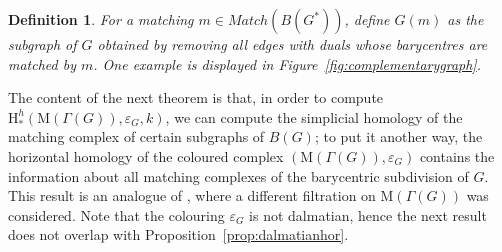 \documentclass[11pt, a4paper, reqno, twoside, makeidx]{amsart}
\theoremstyle{remark}
\theoremstyle{plain}
\newtheorem{defi}[thm]{Definition}
\theoremstyle{definition}
\newcommand{\HH}{\mathrm{H}}
\newcommand{\Mat}{\mathrm{M}}
\begin{document}
\begin{defi}
For a matching $m \in Match(B(G^*))$, define $G(m)$ as the subgraph of $G$ obtained by removing all edges with duals whose barycentres are matched by $m$. One example is displayed in Figure~\ref{fig:complementarygraph}.
\end{defi}
The content of the next theorem is that, in order to compute $\HH^h_*(\Mat (\Gamma(G)), \varepsilon_G, k)$, we can compute the simplicial homology of the matching complex of certain subgraphs of $B(G)$; to put it another way, the horizontal homology of the coloured complex $(\Mat (\Gamma(G)), \varepsilon_G)$ contains the information about all matching complexes of the barycentric subdivision of $G$. This result is an analogue of \cite[Cor.~13]{celoria2020filtered}, where a different filtration on $\Mat(\Gamma(G))$ was considered.
Note that the colouring $\varepsilon_G$ is not dalmatian, hence the next result does not overlap with Proposition~\ref{prop:dalmatianhor}.
\end{document}
